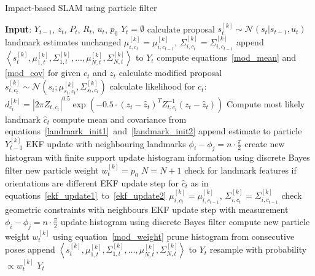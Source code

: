 \begin{algorithm}[H]
\small
\caption{Impact-based SLAM using particle filter}
\label{alg_slam}
\begin{algorithmic}[1]
\BState \textbf{Input}: $Y_{t-1}$, $z_t$, $P_t$, $R_t$, $u_t$, $p_0$
\State $Y_{t} = \emptyset$
\State calculate proposal $s^{[k]}_t\sim\mathcal{N}\left(s_t|s_{t-1},u_t\right)$
\State landmark estimates unchanged $\mu^{[k]}_{i,c_t}=\mu^{[k]}_{i,c_{t-1}}$, $\Sigma^{[k]}_{i,c_t}=\Sigma^{[k]}_{i,c_{t-1}}$
\State  append $\left\langle s^{[k]}_t, \mu^{[k]}_{1,t},\Sigma^{[k]}_{1,t},\dots,\mu^{[k]}_{N,t},\Sigma^{[k]}_{N,t}\right\rangle$ to $Y_t$
\EndFor
\Else
{}
\State compute equations~\ref{mod_mean} and \ref{mod_cov} for given $c_t$ and $z_t$
\State calculate modified proposal $s^{[k]}_{t,c_t}\sim\mathcal{N}\left(s_t;\mu^{[k]}_{s_t,c_t},\Sigma^{[k]}_{s_t,c_t}\right)$
\State calculate likelihood for $c_t$: $d^{[k]}_{c_t}=|2\pi Z_{t,c_t}|^{0.5}\exp\left(-0.5\cdot\left(z_t-\hat{z}_t\right)^TZ^{-1}_{t,c_t}\left(z_t-\hat{z}_t\right)\right)$
\EndFor
\State Compute most likely landmark $\hat{c}_t$ 
\State compute mean and covariance from equations~\ref{landmark_init1}~and~\ref{landmark_init2}
\State append estimate to particle $Y^{[k]}_{t-1}$
\State EKF update with neighbouring landmarks $\phi_i-\phi_j=n\cdot\frac{\pi}{2}$
\State create new histogram with finite support
\State update histogram information using discrete Bayes filter
\State new particle weight $w^{[k]}_t = p_0$
\Else 
{}
\State $N = N + 1$
\State check for landmark features if orientations are different
\State EKF update step for $\hat{c}_t$ as in equations~\ref{ekf_update1}~to~\ref{ekf_update2}
\State $\mu^{[k]}_{i,c_t}=\mu^{[k]}_{i,c_{t-1}}$, $\Sigma^{[k]}_{i,c_t}=\Sigma^{[k]}_{i,c_{t-1}}$
\EndFor
\State check geometric constraints with neighbours
\State EKF update step with measurement $\phi_i-\phi_j=n\cdot\frac{\pi}{2}$
\State update histogram using discrete Bayes filter
\State compute new particle weight $w^{[k]}_t$ using equation~\ref{mod_weight} 
\EndIf
\State prune histogram from consecutive poses
\State append $\left\langle s^{[k]}_t, \mu^{[k]}_{1,t},\Sigma^{[k]}_{1,t},\dots,\mu^{[k]}_{N,t},\Sigma^{[k]}_{N,t}\right\rangle$ to $Y_t$
\EndFor
{}
\State resample with probability $\propto w^{[k]}_t$
\EndIf
\EndIf
\State \Return $Y_t$
\end{algorithmic}
\end{algorithm}